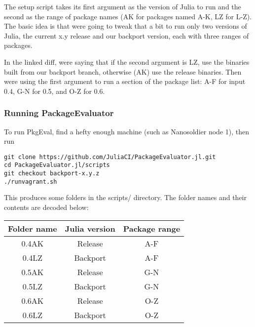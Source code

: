 The setup script takes its first argument as the version of Julia to run and the second as the range of package names (AK for packages named A-K, LZ for L-Z). The basic idea is that we{\textquotesingle}re going to tweak that a bit to run only two versions of Julia, the current x.y release and our backport version, each with three ranges of packages.



In the linked diff, we{\textquotesingle}re saying that if the second argument is LZ, use the binaries built from our backport branch, otherwise (AK) use the release binaries. Then we{\textquotesingle}re using the first argument to run a section of the package list: A-F for input 0.4, G-N for 0.5, and O-Z for 0.6.



\hypertarget{12273793797160936753}{}


\subsubsection{Running PackageEvaluator}



To run PkgEval, find a hefty enough machine (such as Nanosoldier node 1), then run




\begin{lstlisting}
git clone https://github.com/JuliaCI/PackageEvaluator.jl.git
cd PackageEvaluator.jl/scripts
git checkout backport-x.y.z
./runvagrant.sh
\end{lstlisting}



This produces some folders in the scripts/ directory. The folder names and their contents are decoded below:




\begin{table}[h]

\begin{tabulary}{\linewidth}{|C|C|C|}
\hline
Folder name & Julia version & Package range \\
\hline
0.4AK & Release & A-F \\
\hline
0.4LZ & Backport & A-F \\
\hline
0.5AK & Release & G-N \\
\hline
0.5LZ & Backport & G-N \\
\hline
0.6AK & Release & O-Z \\
\hline
0.6LZ & Backport & O-Z \\
\hline
\end{tabulary}

\end{table}



